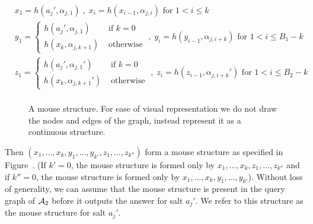 \begin{align*} 
  &x_1= h(a_j',\alpha_{j,1})\;,\; x_i=h(x_{i-1},\alpha_{j,i}) \text{  for $1< i\leq k$}\\
  &y_1= \begin{cases}
    h(a_j',\alpha_{j,1}) &\text{ if }k=0\\
    h(x_k,\alpha_{j,k+1})&\text{ otherwise}
  \end{cases}\;,\;
  y_i=h(y_{i-1},\alpha_{j,i+k}) \text{    for $1< i\leq B_1-k$}\\
  &z_1= \begin{cases}
    h(a_j',\alpha_{j,1}')&\text{ if }k=0\\
    h(x_k,\alpha_{j,k+1}')&\text{ otherwise}
  \end{cases}\;,\;
  z_i=h(z_{i-1},\alpha_{j,i+k}') \text{    for $1< i\leq B_2-k$}\\
\end{align*}
\begin{figure}
  \centering
  \caption{A mouse structure. For ease of visual representation we do not draw the nodes and edges of the graph, instead represent it as a continuous structure.} \label{fig:mouse-structure}
  \end{figure}
Then $(x_1,\ldots,x_k,y_1,\ldots, y_{k'},z_1,\ldots,z_{k''})$ form a mouse structure as specified in Figure~. (If $k'=0$, the mouse structure is formed only by $x_1,\ldots,x_k,z_1,\ldots,z_{k''}$ and if $k''=0$, the mouse structure is formed only by $x_1,\ldots,x_k,y_1,\ldots,y_{k'}$).
Without loss of generality, we can assume that the mouse structure is present in the query graph of $\mathcal{A}_2$ before it outputs the answer for salt $a_j'$.
We refer to this structure as the mouse structure for salt $a_j'$.

